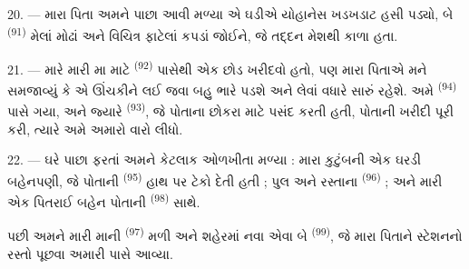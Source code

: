 \VUsaut{3.0mm}

20. --- મારા પિતા અમને પાછા આવી મળ્યા એ ઘડીએ યોહાનેસ ખડખડાટ હસી
પડ્યો, બે  \textsuperscript{(91)} મેલાં
મોઢાં અને વિચિત્ર ફાટેલાં કપડાં જોઈને, જે તદ્દન મેશથી કાળા હતા.

21. --- મારે મારી મા માટે  \textsuperscript{(92)}
પાસેથી એક છોડ ખરીદવો હતો, પણ મારા પિતાએ મને સમજાવ્યું કે એ ઊંચકીને લઈ
જવા બહુ ભારે પડશે અને  લેવાં વધારે સારું રહેશે. અમે
 \textsuperscript{(94)} પાસે ગયા, અને જ્યારે
 \textsuperscript{(93)}, જે પોતાના છોકરા
માટે પસંદ કરતી હતી, પોતાની ખરીદી પૂરી કરી, ત્યારે અમે અમારો વારો
લીધો.

22. --- ઘરે પાછા ફરતાં અમને કેટલાક ઓળખીતા મળ્યા : મારા કુટુંબની એક
ઘરડી બહેનપણી, જે પોતાની 
\textsuperscript{(95)} હાથ પર ટેકો દેતી હતી ; પુલ અને રસ્તાના
 \textsuperscript{(96)} ; અને મારી એક પિતરાઈ બહેન પોતાની
 \textsuperscript{(98)} સાથે.

પછી અમને મારી માની  \textsuperscript{(97)}
મળી અને શહેરમાં નવા એવા બે  \textsuperscript{(99)}, જે
મારા પિતાને સ્ટેશનનો રસ્તો પૂછવા અમારી પાસે આવ્યા.

\VUsaut{6.0mm}
\VUfilet{22mm}
